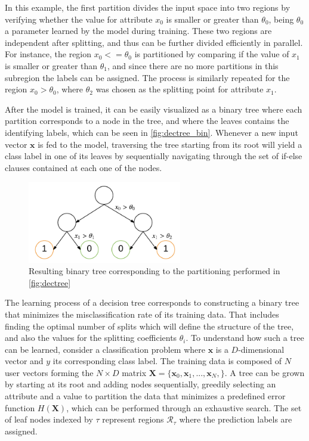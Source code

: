 \documentclass{kththesis}
\begin{document}
In this example, the first partition divides the input space into two regions by verifying whether the value for attribute $x_0$ is smaller or greater than $\theta_0$, being $\theta_0$ a parameter learned by the model during training. These two regions are independent after splitting, and thus can be further divided efficiently in parallel. For instance, the region $x_0 <= \theta_0$ is partitioned by comparing if the value of $x_1$ is smaller or greater than $\theta_1$, and since there are no more partitions in this subregion the labels can be assigned. The process is similarly repeated for the region  $x_0 > \theta_0$, where $\theta_2$ was chosen as the splitting point for attribute $x_1$.
 
After the model is trained, it can be easily visualized as a binary tree where each partition corresponds to a node in the tree, and where the leaves contains the identifying labels, which can be seen in \autoref{fig:dectree_bin}. Whenever a new input vector $\mathbf{x}$ is fed to the model, traversing the tree starting from its root will yield a class label in one of its leaves by sequentially navigating through the set of if-else clauses contained at each one of the nodes.  
 
\begin{figure}[h]
    \centering
    \includegraphics[width=0.6\textwidth,keepaspectratio]{figures/dectree_bin.pdf}
    \caption{Resulting binary tree corresponding to the partitioning performed in \autoref{fig:dectree}}
    \label{fig:dectree_bin}
\end{figure}
 
The learning process of a decision tree corresponds to constructing a binary tree that minimizes the misclassification rate of its training data. That includes finding the optimal number of splits which will define the structure of the tree, and also the values for the splitting coefficients $\theta_i$. To understand how such a tree can be learned, consider a classification problem where $\mathbf{x}$ is a $D$-dimensional vector and $y$ its corresponding class label. The training data is composed of $N$ user vectors forming the $N \times D$ matrix $\mathbf{X} = \{\mathbf{x}_0, \mathbf{x}_1, ..., \mathbf{x}_N,\}$. A tree can be grown by starting at its root and adding nodes sequentially, greedily selecting an attribute and a value to partition the data that minimizes a predefined error function $H(\mathbf{X})$, which can be performed through an exhaustive search. The set of leaf nodes indexed by $\tau$ represent regions $\mathcal{R}_\tau$ where the prediction labels are assigned.
\end{document}
